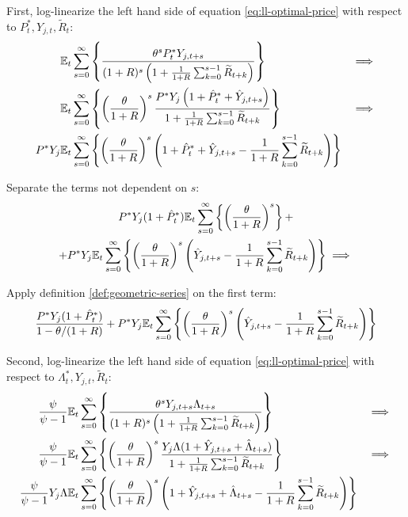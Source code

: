 \documentclass[
thesis.tex
]{subfiles}
\begin{document}
	First, log-linearize the left hand side of equation \ref{eq:ll-optimal-price} with respect to \( P_t^\ast, Y_{j,t}, \widetilde{R}_t \):
	\begin{alignat}{2}
		& {\mathbb{E}_{t}} \sum_{s=0}^{\infty} \left\{ \frac{\theta^s P_t^\ast Y_{j,t+s}}{ (1 + R)^s \left( 1 + \frac{1}{1 + R} \sum_{k=0}^{s-1} \widetilde{R}_{t+k} \right) } \right\} &\implies \nonumber \\
		& {\mathbb{E}_{t}} \sum_{s=0}^{\infty} \left\{ \left( \frac{\theta}{1 + R} \right)^s  \frac{ P^\ast Y_{j} \left( 1 + \hat{P}_t^\ast + \hat{Y}_{j,t+s} \right) }{ 1 + \frac{1}{1 + R} \sum_{k=0}^{s-1} \widetilde{R}_{t+k} } \right\} &\implies \nonumber \\
		P^\ast Y_{j} &{\mathbb{E}_{t}} \sum_{s=0}^{\infty} \left\{ \left( \frac{\theta}{1 + R} \right)^s \left( 1 + \hat{P}_t^\ast + \hat{Y}_{j,t+s} - \frac{1}{1 + R} \sum_{k=0}^{s-1} \widetilde{R}_{t+k} \right) \right\} & \nonumber
	\end{alignat}
	
	Separate the terms not dependent on $s$:
	\begin{multline}
		P^\ast Y_{j} ( 1 + \hat{P}_t^\ast ) {\mathbb{E}_{t}} \sum_{s=0}^{\infty} \left\{ \left( \frac{\theta}{1 + R} \right)^s \right\} + \\
		+ P^\ast Y_{j} {\mathbb{E}_{t}} \sum_{s=0}^{\infty} \left\{ \left( \frac{\theta}{1 + R} \right)^s \left( \hat{Y}_{j,t+s} - \frac{1}{1 + R} \sum_{k=0}^{s-1} \widetilde{R}_{t+k} \right) \right\} \implies \nonumber
	\end{multline}
	
	Apply definition \ref{def:geometric-series} on the first term:
	\begin{align}
		\frac{ P^\ast Y_{j} ( 1 + \hat{P}_t^\ast ) }{1-\theta /(1+R)} + P^\ast Y_{j} {\mathbb{E}_{t}} \sum_{s=0}^{\infty} \left\{ \left( \frac{\theta}{1 + R} \right)^s \left( \hat{Y}_{j,t+s} - \frac{1}{1 + R} \sum_{k=0}^{s-1} \widetilde{R}_{t+k} \right) \right\} \nonumber
	\end{align}
	
	Second, log-linearize the left hand side of equation \ref{eq:ll-optimal-price} with respect to \( \Lambda_t^\ast, Y_{j,t}, \widetilde{R}_t \):
	\begin{alignat}{2}
		\frac{\psi}{\psi-1} &{\mathbb{E}_{t}} \sum_{s=0}^{\infty} \left\{ \frac{\theta^s Y_{j,t+s} \Lambda_{t+s}}{ (1 + R)^s \left( 1 + \frac{1}{1 + R} \sum_{k=0}^{s-1} \widetilde{R}_{t+k} \right) } \right\} & \implies \nonumber \\
		\frac{\psi}{\psi-1} &{\mathbb{E}_{t}} \sum_{s=0}^{\infty} \left\{ \left( \frac{\theta}{1 + R} \right)^s \frac{ Y_{j} \Lambda (1+ \hat{Y}_{j,t+s} + \hat{\Lambda}_{t+s}) }{ 1 + \frac{1}{1 + R} \sum_{k=0}^{s-1} \widetilde{R}_{t+k} } \right\} & \implies \nonumber \\
		\frac{\psi}{\psi-1} Y_{j} \Lambda &{\mathbb{E}_{t}} \sum_{s=0}^{\infty} \left\{ \left( \frac{\theta}{1 + R} \right)^s \left( 1+ \hat{Y}_{j,t+s} + \hat{\Lambda}_{t+s} - \frac{1}{1 + R} \sum_{k=0}^{s-1} \widetilde{R}_{t+k} \right) \right\} & \nonumber
	\end{alignat}
	
\end{document}
